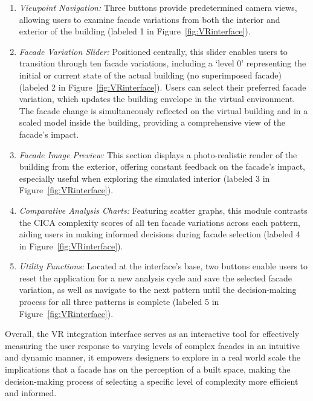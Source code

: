 \begin{enumerate}
\item \textit{Viewpoint Navigation:} Three buttons provide predetermined camera views, allowing users to examine facade variations from both the interior and exterior of the building (labeled 1 in Figure~\ref{fig:VRinterface}).

\item \textit{Facade Variation Slider:} Positioned centrally, this slider enables users to transition through ten facade variations, including a `level 0' representing the initial or current state of the actual building (no superimposed facade) (labeled 2 in Figure~\ref{fig:VRinterface}).
Users can select their preferred facade variation, which updates the building envelope in the virtual environment.
The facade change is simultaneously reflected on the virtual building and in a scaled model inside the building, providing a comprehensive view of the facade's impact.

\item \textit{Facade Image Preview:} This section displays a photo-realistic render of the building from the exterior, offering constant feedback on the facade's impact, especially useful when exploring the simulated interior (labeled 3 in Figure~\ref{fig:VRinterface}).

\item \textit{Comparative Analysis Charts:} Featuring scatter graphs, this module contrasts the CICA complexity scores of all ten facade variations across each pattern, aiding users in making informed decisions during facade selection (labeled 4 in Figure~\ref{fig:VRinterface}).

\item \textit{Utility Functions:} Located at the interface's base, two buttons enable users to reset the application for a new analysis cycle and save the selected facade variation, as well as navigate to the next pattern until the decision-making process for all three patterns is complete (labeled 5 in Figure~\ref{fig:VRinterface}).
\end{enumerate}

Overall, the VR integration interface serves as an interactive tool for effectively measuring the user response to varying levels of complex facades in an intuitive and dynamic manner, it empowers designers to explore in a real world scale the implications that a facade has on the perception of a built space, making the decision-making process of selecting a specific level of complexity more efficient and informed.







